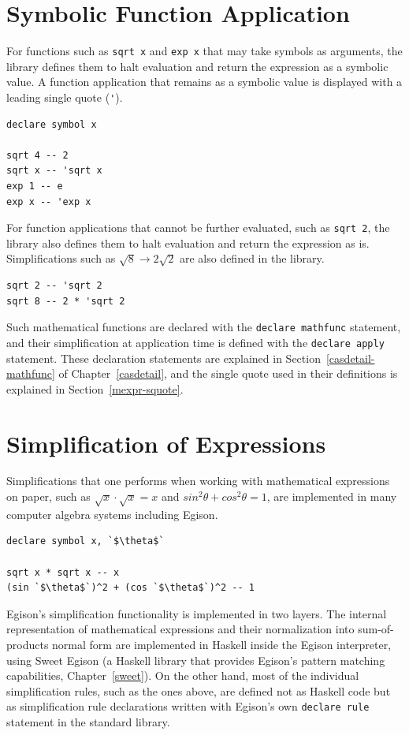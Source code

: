 \section{Symbolic Function Application}\label{cas-symbol2}

For functions such as \lstinline{sqrt x} and \lstinline{exp x} that may take symbols as arguments, the library defines them to halt evaluation and return the expression as a symbolic value.
A function application that remains as a symbolic value is displayed with a leading single quote (\lstinline{'}).
\begin{lstlisting}[language=egison,numbers=none]
declare symbol x

sqrt 4 -- 2
sqrt x -- 'sqrt x
exp 1 -- e
exp x -- 'exp x
\end{lstlisting}

For function applications that cannot be further evaluated, such as \lstinline{sqrt 2}, the library also defines them to halt evaluation and return the expression as is.
Simplifications such as $\sqrt{8} \rightarrow 2 \sqrt{2}$ are also defined in the library.
\begin{lstlisting}[language=egison,numbers=none]
sqrt 2 -- 'sqrt 2
sqrt 8 -- 2 * 'sqrt 2
\end{lstlisting}
Such mathematical functions are declared with the \lstinline{declare mathfunc} statement, and their simplification at application time is defined with the \lstinline{declare apply} statement.
These declaration statements are explained in Section~\ref{casdetail-mathfunc} of Chapter~\ref{casdetail}, and the single quote used in their definitions is explained in Section~\ref{mexpr-squote}.


\section{Simplification of Expressions}\label{cas-simplify}

Simplifications that one performs when working with mathematical expressions on paper, such as $\sqrt{x} \cdot \sqrt{x} = x$ and $sin^2\theta + cos^2\theta = 1$, are implemented in many computer algebra systems including Egison.
\begin{lstlisting}[language=egison,numbers=none]
declare symbol x, `$\theta$`

sqrt x * sqrt x -- x
(sin `$\theta$`)^2 + (cos `$\theta$`)^2 -- 1
\end{lstlisting}
Egison's simplification functionality is implemented in two layers.
The internal representation of mathematical expressions and their normalization into sum-of-products normal form are implemented in Haskell inside the Egison interpreter, using Sweet Egison (a Haskell library that provides Egison's pattern matching capabilities, Chapter~\ref{sweet}).
On the other hand, most of the individual simplification rules, such as the ones above, are defined not as Haskell code but as simplification rule declarations written with Egison's own \lstinline{declare rule} statement in the standard library.

